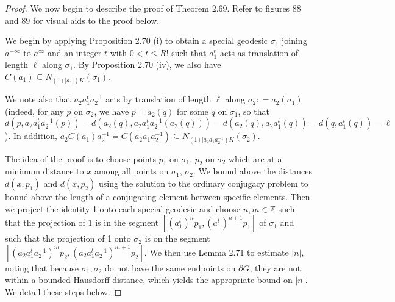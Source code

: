 \documentclass[12pt]{article}
\newcommand{\vs}{\vskip10pt}
\begin{document}
	
	\begin{proof}
		
		We now begin to describe the proof of Theorem 2.69. Refer to figures 88 and 89 for visual aids to the proof below. 
		
		\vs 
		
		We begin by applying Proposition 2.70 (i) to obtain a special geodesic $\sigma_1$ joining $a^{-\infty}$ to $a^{\infty}$ and an integer $t$ with $0 < t \leq R!$ such that $a_1^t$ acts as translation of length $\ell$ along $\sigma_1$. By Proposition 2.70 (iv), we also have $C(a_1) \subseteq N_{(1 + \vert a_1 \vert)K}(\sigma_1)$. 
		
		\vs 
		
		We note also that $a_2 a_1^t a_2^{-1}$ acts by translation of length $\ell$ along $\sigma_2 : = a_2 (\sigma_1)$ (indeed, for any $p$ on $\sigma_2$, we have $p = a_2 (q)$ for some $q$ on $\sigma_1$, so that $d(p, a_2 a_1^t a_2^{-1}(p) )= d(a_2(q), a_2 a_1^t a_2^{-1}(a_2(q))) = d(a_2(q), a_2 a_1^t (q)) = d(q, a_1^t (q)) = \ell$). In addition, $a_2C(a_1)a_2^{-1} = C(a_2 a_1 a_2^{-1}) \subseteq N_{(1 + \vert a_2 a_1 a_2^{-1})K}(\sigma_2)$. 
		
		\vs 
		
		The idea of the proof is to choose points $p_1$ on $\sigma_1$, $p_2$ on $\sigma_2$ which are at a minimum distance to $x$ among all points on $\sigma_1$, $\sigma_2$. We bound above the distances $d(x, p_1)$ and $d(x, p_2)$ using the solution to the ordinary conjugacy problem to bound above the length of a conjugating element between specific elements. Then we project the identity 1 onto each special geodesic and choose $n,m \in \mathbb{Z}$ such that the projection of 1 is in the segment $[(a_1^t)^n p_1, (a_1^t)^{n+1} p_1]$ of $\sigma_1$ and such that the projection of 1 onto $\sigma_2$ is on the segment $[(a_2 a_1^t a_2^{-1})^m p_2, (a_2 a_1^t a_2^{-1})^{m+1} p_2]$. We then use Lemma 2.71 to estimate $\vert n \vert$, noting that because $\sigma_1, \sigma_2$ do not have the same endpoints on $\partial G$, they are not within a bounded Hausdorff distance, which yields the appropriate bound on $\vert n \vert$. We detail these steps below.
		
		\vs 
		

\end{proof}
\end{document}
